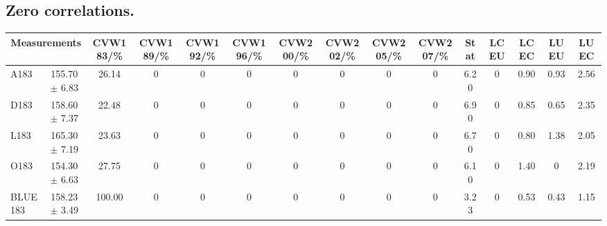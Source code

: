 \subsection{Zero correlations.}
\begin{table}[H]
\scriptsize
\begin{center}
\renewcommand{\arraystretch}{1.1}
\begin{tabular}{|lc|c|c|c|c|c|c|c|c|ccccc|}
\hline
\multicolumn{2}{|c|}{Measurements} & CVW{\tiny 183}/\%  & CVW{\tiny 189}/\%  & CVW{\tiny 192}/\%  & CVW{\tiny 196}/\%  & CVW{\tiny 200}/\%  & CVW{\tiny 202}/\%  & CVW{\tiny 205}/\%  & CVW{\tiny 207}/\%  & {\tiny Stat} & {\tiny LCEU} & {\tiny LCEC} & {\tiny LUEU} & {\tiny LUEC}\\
\hline
A183 &     155.70 $\pm$       6.83 &      26.14 &  0 &  0 &  0 &  0 &  0 &  0 &  0 &       6.20 &  0 &       0.90 &       0.93 &       2.56\\
D183 &     158.60 $\pm$       7.37 &      22.48 &  0 &  0 &  0 &  0 &  0 &  0 &  0 &       6.90 &  0 &       0.85 &       0.65 &       2.35\\
L183 &     165.30 $\pm$       7.19 &      23.63 &  0 &  0 &  0 &  0 &  0 &  0 &  0 &       6.70 &  0 &       0.80 &       1.38 &       2.05\\
O183 &     154.30 $\pm$       6.63 &      27.75 &  0 &  0 &  0 &  0 &  0 &  0 &  0 &       6.10 &  0 &       1.40 &  0 &       2.19\\
\hline
BLUE {\tiny 183} &     158.23 $\pm$       3.49 &     100.00 &  0 &  0 &  0 &  0 &  0 &  0 &  0 &       3.23 &  0 &       0.53 &       0.43 &       1.15\\
\hline
\end{tabular}
\renewcommand{\arraystretch}{1}
\end{center}
\end{table}
\vspace*{-0.5cm}
